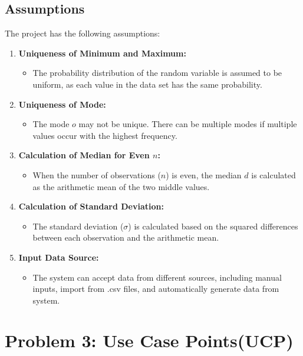 \documentclass[english,12pt,a4paper]{report}
\begin{document}
	\section{Assumptions}
	The project has the following assumptions:
	\begin{enumerate}
		
		\item \textbf{Uniqueness of Minimum and Maximum:} 
		\begin{itemize}
			\item The probability distribution of the random variable is assumed to be uniform, as each value in the data set has the same probability.
		\end{itemize}
		
		\item \textbf{Uniqueness of Mode:} 
		\begin{itemize}
			\item The mode $o$ may not be unique. There can be multiple modes if multiple values occur with the highest frequency.
		\end{itemize}
		
		\item \textbf{Calculation of Median for Even $n$:} 
		\begin{itemize}
			\item When the number of observations ($n$) is even, the median $d$ is calculated as the arithmetic mean of the two middle values.
		\end{itemize}
		
		\item \textbf{Calculation of Standard Deviation:} 
		\begin{itemize}
			\item The standard deviation ($\sigma$) is calculated based on the squared differences between each observation and the arithmetic mean.
		\end{itemize}
		
		\item \textbf{Input Data Source:} 
		\begin{itemize}
			\item The system can accept data from different sources, including manual inputs, import from .csv files, and automatically generate data from system.
		\end{itemize}
	\end{enumerate}
	
	
	\chapter{Problem 3: Use Case Points(UCP)}
\end{document}
